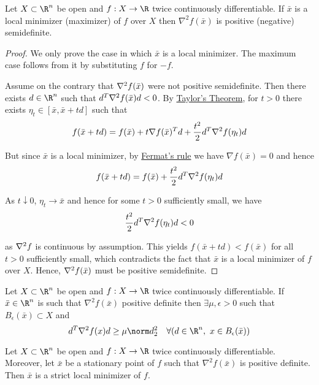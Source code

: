 \label{ce5370d}

Let $X\subset\R^n$ be open and $f:X\to\R$ twice continuously differentiable. If
$\bar x$ is a local minimizer (maximizer) of $f$ over $X$ then $\nabla^2f(\bar
x)$ is positive (negative) semidefinite.

\begin{proof}
  \def\x{\bar x}
  \def\H#1{\nabla^2f\ifx&#1&\else(#1)\fi}
  \def\G{\nabla f(\x)}
  We only prove the case in which $\x$ is a local minimizer. The maximum case
  follows from it by substituting $f$ for $-f$.

  Assume on the contrary that $\H\x$ were not positive semidefinite. Then there
  exists $d\in\R^n$ such that $d^T\H\x d<0$. By \href{b90111f}{Taylor's
  Theorem}, for $t>0$ there exists $\eta_t\in[\x,\x+td]$ such that
  $$
    f(\x+td)=f(\x)+t\G^Td+\frac{t^2}2d^T\H{\eta_t}d
  $$

  But since $\x$ is a local minimizer, by \href{dc165c9}{Fermat's rule} we have
  $\G=0$ and hence
  $$
    f(\x+td)=f(\x)+\frac{t^2}2d^T\H{\eta_t}d
  $$

  As $t\downarrow0$, $\eta_t\to\x$ and hence for some $t>0$ sufficiently small,
  we have
  $$
    \frac{t^2}2d^T\H{\eta_t}d<0
  $$

  as $\H{}$ is continuous by assumption. This yields $f(\x+td)<f(\x)$ for all
  $t>0$ sufficiently small, which contradicts the fact that $\x$ is a local
  minimizer of $f$ over $X$. Hence, $\H\x$ must be positive semidefinite.
\end{proof}

\Lemma{}\label{eaa0d24}

Let $X\subset\R^n$ be open and $f:X\to\R$ twice continuously differentiable. If
$\bar x\in\R^n$ is such that $\nabla^2f(\bar x)$ positive definite then
$\exists\mu,\epsilon>0$ such that $B_\epsilon(\bar x)\subset X$ and
$$
  d^T\nabla^2f(x)d\geq\mu\norm d^2_2\quad\forall(d\in\R^n,\
  x\in B_\epsilon(\bar x))
$$

\label{b43d95d}

Let $X\subset\R^n$ be open and $f:X\to\R$ twice continuously differentiable.
Moreover, let $\bar x$ be a stationary point of $f$ such that $\nabla^2f(\bar
x)$ is positive definite. Then $\bar x$ is a strict local minimizer of $f$.

\label{cd9cea7}

